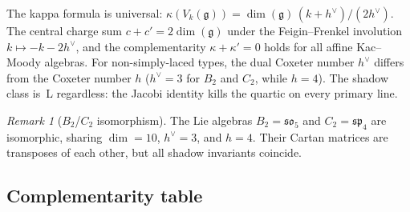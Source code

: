 \documentclass[11pt]{article}
\theoremstyle{plain}
\theoremstyle{definition}
\theoremstyle{remark}
\newtheorem{remark}[theorem]{Remark}
\providecommand{\fg}{\mathfrak{g}}
\begin{document}
\noindent
The kappa formula is universal:
$\kappa(V_k(\fg)) = \dim(\fg)\,(k + h^\vee)/(2h^\vee)$.
The central charge sum $c + c' = 2\dim(\fg)$ under the
Feigin--Frenkel involution $k \mapsto -k - 2h^\vee$, and
the complementarity $\kappa + \kappa' = 0$ holds for all
affine Kac--Moody algebras. For non-simply-laced types,
the dual Coxeter number $h^\vee$ differs from the Coxeter
number $h$ ($h^\vee = 3$ for $B_2$ and $C_2$, while $h = 4$).
The shadow class is~L regardless: the Jacobi identity kills the
quartic on every primary line.

\begin{remark}[$B_2$/$C_2$ isomorphism]
The Lie algebras $B_2 = \mathfrak{so}_5$ and
$C_2 = \mathfrak{sp}_4$ are isomorphic, sharing $\dim = 10$,
$h^\vee = 3$, and $h = 4$. Their Cartan matrices are transposes
of each other, but all shadow invariants coincide.
\end{remark}


\subsection{Complementarity table}\label{ssec:complementarity-table}
\end{document}
